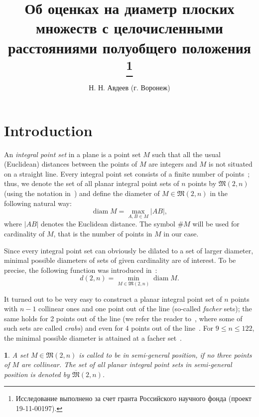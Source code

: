\documentclass[11pt,twoside,draft
]{article}
\title
{%
Об оценках на диаметр плоских множеств с целочисленными расстояниями полуобщего положения%
\footnote{Исследование выполнено за счет гранта Российского научного фонда (проект 19-11-00197).}}
{%
On diameter bounds for planar integral point sets in semi-general position}
\author
{%
Н. Н. Авдеев (г. Воронеж)}
{%
N. N. Avdeev (Voronezh)}
\newtheorem{Definition}{\indent {\sc Definition}}
\begin{document}
\maketitle

\enmaketitle



\section{Introduction}



An \textit{integral point set} in a plane is a point set $M$ such that all the usual (Euclidean) distances between the
points of $M$ are integers and $M$ is not situated on a straight line.
Every integral point set consists of a finite number of points~\cite{anning1945integral,erdos1945integral};
thus, we denote the set of all planar integral point sets of $n$ points by
$\mathfrak{M}(2,n)$ (using the notation in~\cite{our-vmmsh-2018})
and define the diameter of $M\in\mathfrak{M}(2,n)$ in the following natural way:
\begin{equation}
	\operatorname{diam} M = \max_{A,B\in M} |AB|
	,
\end{equation}
where $|AB|$ denotes the Euclidean distance.
The symbol $\# M$ will be used for cardinality of $M$, that is the number of points in $M$ in our case.

Since every integral point set can obviously be dilated to a set of larger diameter,
minimal possible diameters of sets of given cardinality are of interest.
To be precise,
the following function was introduced in~\cite{kurz2008bounds,kurz2008minimum}:
\begin{equation}
	d(2,n) = \min_{M\in\mathfrak{M}(2,n)} \operatorname{diam} M
	.
\end{equation}

It turned out to be very easy to construct a planar integral point set of $n$ points with $n-1$ collinear ones and one point out of the line
(so-called \textit{facher} sets);
the same holds for 2 points out of the line (we refer the reader to~\cite{antonov2008maximal}, where some of such sets are called \textit{crabs})
and even for 4 points out of the line~\cite{huff1948diophantine}.
For $9\leq n\leq 122$, the minimal possible diameter is attained at a facher set~\cite{kurz2008bounds}.


\begin{Definition}
	A set $M\in\mathfrak{M}(2,n)$ is called to be in \textit{semi-general position},
	if no three points of $M$ are collinear.
	The set of all planar integral point sets in semi-general position
	is denoted by $\overline{\mathfrak{M}}(2,n)$.
\end{Definition}
\end{document}
